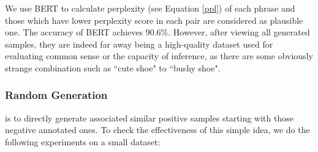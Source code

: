We use BERT to calculate perplexity (see Equation \ref{ppl}) of each phrase and those which have lower perplexity score in each pair are considered as plausible one. The accuracy of BERT achieves 90.6\%. However, after viewing all generated samples,
they are indeed far away being a high-quality dataset used for evaluating common sense or the capacity of inference, as there are some obviously strange combination such as ``cute shoe" to ``bushy shoe".

\iffalse
\subsubsection{Random Generation}

 is to directly generate associated similar positive samples starting with those negative annotated ones. %
To check the effectiveness of this simple idea, we do the following experiments on a small dataset:
